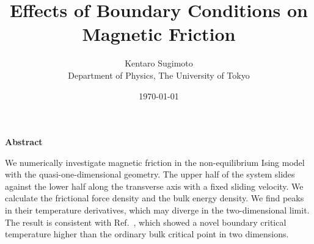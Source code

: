 \documentclass[a4paper,12pt,dvipdfmx]{book}
\theoremstyle{definition}
\newcounter{one}
\begin{document}
\title{Effects of Boundary Conditions on Magnetic Friction}
\author{Kentaro Sugimoto \\ Department of Physics, The University of Tokyo }
\date{\today}
\maketitle

\clearpage
\begin{center}
\large{{\bf Abstract}}
\end{center}
We numerically investigate magnetic friction in the non-equilibrium Ising model with the quasi-one-dimensional geometry. The upper half of the system slides against the lower half along the transverse axis with a fixed sliding velocity. We calculate the frictional force density and the bulk energy density. We find peaks in their temperature derivatives, which may diverge in the two-dimensional limit. The result is consistent with Ref.~\cite{Hucht2009b}, which showed a novel boundary critical temperature higher than the ordinary bulk critical point in two dimensions.
\tableofcontents



%
%


\appendix

%
%
\printbibliography
\end{document}
